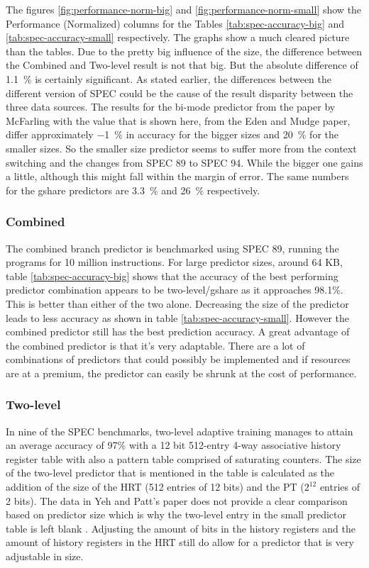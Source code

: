 The figures \ref{fig:performance-norm-big} and \ref{fig:performance-norm-small} show the Performance (Normalized) columns for the Tables \ref{tab:spec-accuracy-big} and \ref{tab:spec-accuracy-small} respectively.
The graphs show a much cleared picture than the tables.
Due to the pretty big influence of the size, the difference between the Combined and Two-level result is not that big.
But the absolute difference of \SI{1.1}{\percent} is certainly significant.
As stated earlier, the differences between the different version of SPEC could be the cause of the result disparity between the three data sources.
The results for the bi-mode predictor from the paper by McFarling \cite{hybrid} with the value that is shown here, from the Eden and Mudge \cite{yags} paper, differ approximately \SI{-1}{\percent} in accuracy for the bigger sizes and \SI{20}{\percent} for the smaller sizes.
So the smaller size predictor seems to suffer more from the context switching and the changes from SPEC 89 to SPEC 94.
While the bigger one gains a little, although this might fall within the margin of error.
The same numbers for the gshare predictors are \SI{3.3}{\percent} and \SI{26}{\percent} respectively.

\subsubsection*{Combined}
The combined branch predictor is benchmarked using SPEC 89, running the programs for 10 million instructions.
For large predictor sizes, around 64 KB, table \ref{tab:spec-accuracy-big} shows that the accuracy of the best performing predictor combination appears to be two-level/gshare as it approaches 98.1\%. This is better than either of the two alone. Decreasing the size of the predictor leads to less accuracy as shown in table \ref{tab:spec-accuracy-small}. However the combined predictor still has the best prediction accuracy. A great advantage of the combined predictor is that it's very adaptable. There are a lot of combinations of predictors that could possibly be implemented and if resources are at a premium, the predictor can easily be shrunk at the cost of performance.

\subsubsection*{Two-level}
In nine of the SPEC benchmarks, two-level adaptive training manages to attain an average accuracy of 97\% with a 12 bit 512-entry 4-way associative history register table with also a pattern table comprised of saturating counters. 
The size of the two-level predictor that is mentioned in the table is calculated as the addition of the size of the HRT (512 entries of 12 bits) and the PT ($2^{12}$ entries of 2 bits). 
The data in Yeh and Patt's paper does not provide a clear comparison based on predictor size which is why the two-level entry in the small predictor table is left blank \cite{twolevel}. 
Adjusting the amount of bits in the history registers and the amount of history registers in the HRT still do allow for a predictor that is very adjustable in size.

